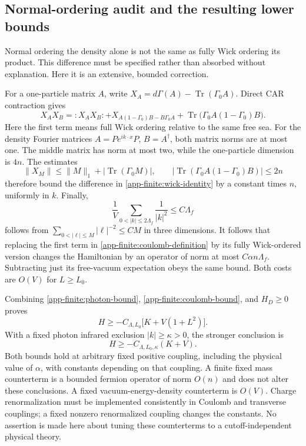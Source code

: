 \subsection{Normal-ordering audit and the resulting lower bounds}
\label{app-finite:wick}

Normal ordering the density alone is not the same as fully Wick ordering its
product.  This difference must be specified rather than absorbed without
explanation.  Here it is an extensive, bounded correction.

For a one-particle matrix $A$, write
$X_A=d\Gamma(A)-\operatorname{Tr}(\Gamma_0A)$.  Direct CAR contraction gives
\begin{equation}
 X_A X_B
 =:\!X_A X_B\!:
  +X_{A(1-\Gamma_0)B-B\Gamma_0A}
  +\operatorname{Tr}\bigl(\Gamma_0A(1-\Gamma_0)B\bigr).
 \label{app-finite:wick-identity}
\end{equation}
Here the first term means full Wick ordering relative to the same free sea.
For the density Fourier matrices $A=P e^{ik\cdot x}P$, $B=A^\dagger$, both
matrix norms are at most one.  The middle matrix has norm at most two, while
the one-particle dimension is $4n$.  The estimates
\[
 \|X_M\|\le\|M\|_1+|\operatorname{Tr}(\Gamma_0M)|,
 \qquad
 |\operatorname{Tr}(\Gamma_0A(1-\Gamma_0)B)|\le2n
\]
therefore bound the difference in \eqref{app-finite:wick-identity} by a
constant times $n$, uniformly in $k$.  Finally,
\begin{equation}
 \frac1V\sum_{0<|k|\le2\Lambda_f}\frac1{|k|^2}
 \le C\Lambda_f
 \label{app-finite:coulomb-sum}
\end{equation}
follows from $\sum_{0<|\ell|\le M}|\ell|^{-2}\le CM$ in three dimensions.
It follows that replacing the first term in
\eqref{app-finite:coulomb-definition} by its fully Wick-ordered version
changes the Hamiltonian by an operator of norm at most $C\alpha n\Lambda_f$.
Subtracting just its free-vacuum expectation obeys the same bound.  Both costs
are $O(V)$ for $L\ge L_0$.

Combining \eqref{app-finite:photon-bound},
\eqref{app-finite:coulomb-bound}, and $H_D\ge0$ proves
\begin{equation}
 H\ge-C_{\Lambda,L_0}\bigl[K+V(1+L^2)\bigr].
 \label{app-finite:polynomial-bound}
\end{equation}
With a fixed photon infrared exclusion $|k|\ge\kappa>0$, the stronger
conclusion is
\begin{equation}
 H\ge-C_{\Lambda,L_0,\kappa}(K+V).
 \label{app-finite:ir-extensive}
\end{equation}
Both bounds hold at arbitrary fixed positive coupling, including the physical
value of $\alpha$, with constants depending on that coupling.  A finite fixed
mass counterterm is a bounded fermion operator of norm $O(n)$ and does not
alter these conclusions.  A fixed vacuum-energy-density counterterm is
$O(V)$.  Charge renormalization must be implemented consistently in Coulomb
and transverse couplings; a fixed nonzero renormalized coupling changes the
constants.  No assertion is made here about tuning these counterterms to a
cutoff-independent physical theory.

